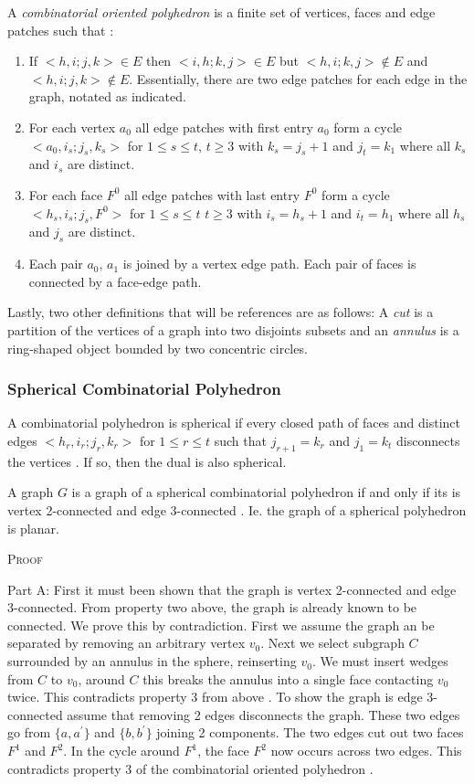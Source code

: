 \documentclass[11pt]{article}
\begin{document}
A \emph{combinatorial oriented polyhedron} is a finite set of vertices, faces and edge patches such that \cite{mccProof}:
\begin{enumerate}
	\item If $<h,i;j,k> \in E$ then $<i,h;k,j> \in E$ but $<h,i;k,j> \not\in E$ and $<h,i;j,k> \not\in E$. Essentially, there are two edge patches for each edge in the graph, notated as indicated.
	\item For each vertex $a_0$ all edge patches with first entry $a_0$ form a cycle $<a_0,i_s;j_s,k_s>$ for $1\leq s \leq t$, $t\geq3$ with $k_s = j_s + 1$ and $j_t = k_1$ where all $k_s$ and $i_s$ are distinct. 
	\item For each face $F^0$ all edge patches with last entry $F^0$ form a cycle $<h_s, i_s;j_s,F^0>$ for $1\leq s \leq t$ $t\geq3$ with $i_s = h_s + 1$ and $i_t = h_1$ where all $h_s$ and $j_s$ are distinct.
	\item Each pair $a_0$, $a_1$ is joined by a vertex edge path. Each pair of faces is connected by a face-edge path. 
\end{enumerate}

Lastly, two other definitions that will be references are as follows:
A \emph{cut} is a partition of the vertices of a graph into two disjoints subsets and an \emph{annulus} is a ring-shaped object bounded by two concentric circles. 

\subsubsection{Spherical Combinatorial Polyhedron}
A combinatorial polyhedron is spherical if every closed path of faces and distinct edges $<h_r,i_r;j_r,k_r>$ for $1 \leq r \leq t$ such that $j_{r+1} = k_r$ and $j_1 = k_t$ disconnects the vertices \cite{mccProof}. If so, then the dual is also spherical. 

A graph $G$ is a graph of a spherical combinatorial polyhedron if and only if its is vertex 2-connected and edge 3-connected \cite{mccProof}. Ie. the graph of a spherical polyhedron is planar.

\textsc{Proof}

Part A: First it must been shown that the graph is vertex 2-connected and edge 3-connected. From property two above, the graph is already known to be connected. We prove this by contradiction. First we assume the graph an be separated by removing an arbitrary vertex $v_0$. Next we select subgraph $C$ surrounded by an annulus in the sphere, reinserting $v_0$. We must insert wedges from $C$ to $v_0$, around $C$ this breaks the annulus into a single face contacting $v_0$ twice. This contradicts property 3 from above \cite{mccProof}.
To show the graph is edge 3-connected assume that removing 2 edges disconnects the graph. These two edges go from $\{a,a^{'}\}$ and $\{b, b^{'}\}$ joining 2 components. The two edges cut out two faces $F^1$ and $F^2$. In the cycle around $F^1$, the face $F^2$ now occurs across two edges. This contradicts property 3 of the combinatorial oriented polyhedron \cite{mccProof}.
\end{document}
